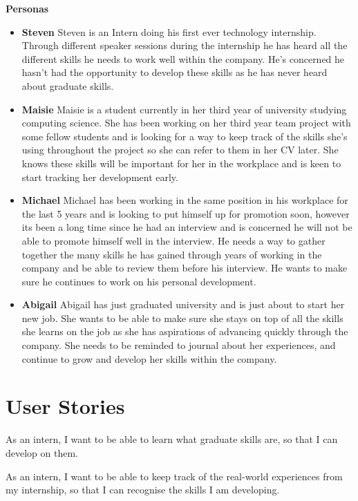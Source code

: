 \documentclass{l4proj}
\begin{document}
\begin{appendices}
\textbf{Personas}
\begin{itemize}
    \item \textbf{Steven} Steven is an Intern doing his first ever technology internship. Through different speaker sessions during the internship he has heard all the different skills he needs to work well within the company. He's concerned he hasn't had the opportunity to develop these skills as he has never heard about graduate skills.
    \item \textbf{Maisie} Maisie is a student currently in her third year of university studying computing science. She has been working on her third year team project with some fellow students and is looking for a way to keep track of the skills she's using throughout the project so she can refer to them in her CV later. She knows these skills will be important for her in the workplace and is keen to start tracking her development early.
    \item \textbf{Michael} Michael has been working in the same position in his workplace for the last 5 years and is looking to put himself up for promotion soon, however its been a long time since he had an interview and is concerned he will not be able to promote himself well in the interview. He needs a way to gather together the many skills he has gained through years of working in the company and be able to review them before his interview. He wants to make sure he continues to work on his personal development.
    \item \textbf{Abigail} Abigail has just graduated university and is just about to start her new job. She wants to be able to make sure she stays on top of all the skills she learns on the job as she has aspirations of advancing quickly through the company. She needs to be reminded to journal about her experiences, and continue to grow and develop her skills within the company.
\end{itemize}

%

\section{User Stories} \label{Appendix-userStories}

As an intern, I want to be able to learn what graduate skills are, so that I can develop on them.

As an intern, I want to be able to keep track of the real-world experiences from my internship, so that I can recognise the skills I am developing.


\end{appendices}
\end{document}
